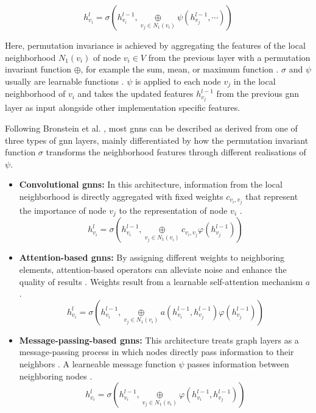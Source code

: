 \begin{equation}
    h_{v_i}^l = \sigma(h_{v_i}^{l-1}, \underset{v_j \in N_1(v_i)}{\oplus} \psi(h_{v_j}^{l-1}, \cdots))
\end{equation}

Here, permutation invariance is achieved by aggregating the features of the local neighborhood $N_1(v_i)$ of node $v_i \in V$ from the previous layer with a permutation invariant function $\oplus$, for example the sum, mean, or maximum function \cite{bronstein_geometric_2021}. $\sigma$ and $\psi$ usually are learnable functions \cite{bronstein_geometric_2021}. $\psi$ is applied to each node $v_j$ in the local neighborhood of $v_i$ and takes the updated features $h_{v_j}^{l-1}$ from the previous \gls{gnn} layer as input alongside other implementation specific features.

Following Bronstein et al. \cite{bronstein_geometric_2021}, most \glspl{gnn} can be described as derived from one of three types of \gls{gnn} layers, mainly differentiated by how the permutation invariant function $\sigma$ transforms the neighborhood features through different realisations of $\psi$.

\begin{itemize}
    \item \textbf{Convolutional \glspl{gnn}:} In this architecture, information from the local neighborhood is directly aggregated with fixed weights $c_{v_i, v_j}$ that represent the importance of node $v_j$ to the representation of node $v_i$ \cite{bronstein_geometric_2021, wu_comprehensive_2021}.
    \begin{equation}
        h_{v_i}^l = \sigma(h_{v_i}^{l-1}, \underset{v_j \in N_1(v_i)}{\oplus} c_{v_i, v_j} \varphi(h_{v_j}^{l-1}))
    \end{equation}
    
    \item \textbf{Attention-based \glspl{gnn}:} By assigning different weights to neighboring elements, attention-based operators can alleviate noise and enhance the quality of results \cite{zhou_graph_2020}. Weights result from a learnable self-attention mechanism $a$ \cite{bronstein_geometric_2021}.
    \begin{equation}
        h_{v_i}^l = \sigma(h_{v_i}^{l-1}, \underset{v_j \in N_1(v_i)}{\oplus} a(h_{v_i}^{l-1}, h_{v_j}^{l-1}) \varphi(h_{v_j}^{l-1}))
    \end{equation}

    \item \textbf{Message-passing-based \glspl{gnn}:} This architecture treats graph layers as a message-passing process in which nodes directly pass information to their neighbors \cite{wu_comprehensive_2021}. A learneable message function $\psi$ passes information between neighboring nodes \cite{bronstein_geometric_2021}.
    \begin{equation}
        h_{v_i}^l = \sigma(h_{v_i}^{l-1}, \underset{v_j \in N_1(v_i)}{\oplus} \varphi(h_{v_i}^{l-1}, h_{v_j}^{l-1}))
    \end{equation}
\end{itemize}

